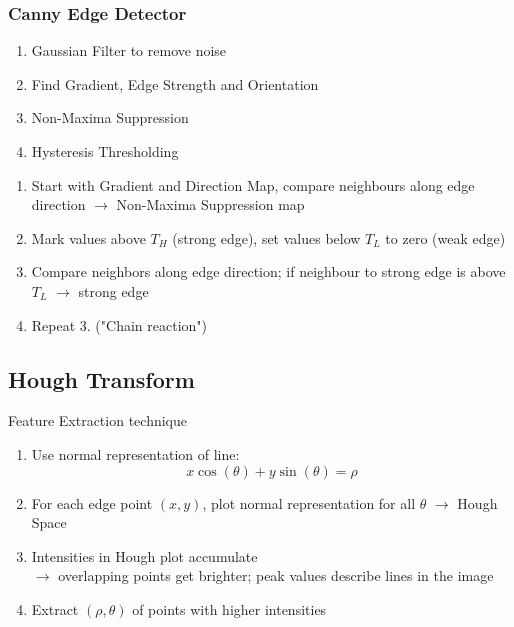         \subsubsection{Canny Edge Detector}
            \begin{enumerate}
                \item Gaussian Filter to remove noise
                \item Find Gradient, Edge Strength and Orientation
                \item Non-Maxima Suppression
                \item Hysteresis Thresholding
            \end{enumerate}
                \begin{enumerate}
                    \item Start with Gradient and Direction Map, compare neighbours along edge direction $\rightarrow$ Non-Maxima Suppression map
                    \item Mark values above $T_H$ (strong edge), set values below $T_L$ to zero (weak edge)
                    \item Compare neighbors along edge direction; if neighbour to strong edge is above $T_L$ $\rightarrow$ strong edge
                    \item Repeat 3. ("Chain reaction")
                \end{enumerate}
            \vfill \null \columnbreak
        \subsection{Hough Transform}
            Feature Extraction technique
            \begin{enumerate}
                \item Use normal representation of line:
                    $$
                        x \cos(\theta) + y \sin(\theta) = \rho
                    $$
                \item For each edge point $(x,y)$, plot normal representation for all $\theta$ $\rightarrow$ Hough Space
                \item Intensities in Hough plot accumulate\\
                        $\rightarrow$ overlapping points get brighter; peak values describe lines in the image 
                \item Extract $(\rho, \theta)$ of points with higher intensities
            \end{enumerate}
